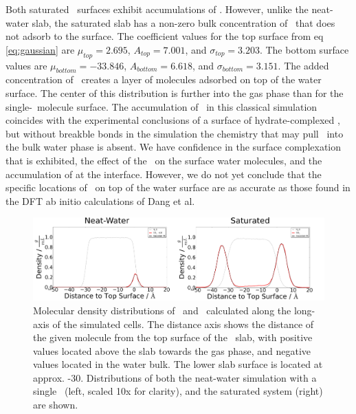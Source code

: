 Both saturated \suldiox~surfaces exhibit accumulations of \suldiox. However, unlike the neat-water slab, the saturated slab has a non-zero bulk concentration of \suldiox~that does not adsorb to the surface. The coefficient values for the top surface from eq \ref{eq:gaussian} are $\mu_{top}=2.695$, $A_{top}=7.001$, and $\sigma_{top}=3.203$. The bottom surface values are $\mu_{bottom}=-33.846$, $A_{bottom}=6.618$, and $\sigma_{bottom}=3.151$\angs. The added concentration of \suldiox~creates a layer of molecules adsorbed on top of the water surface. The center of this distribution is further into the gas phase than for the single-\suldiox~molecule surface. The accumulation of \suldiox~in this classical simulation coincides with the experimental conclusions of a surface of hydrate-complexed \suldiox, but without breakble bonds in the simulation the chemistry that may pull \suldiox~into the bulk water phase is absent. We have confidence in the surface complexation that is exhibited, the effect of the \suldiox~on the surface water molecules, and the accumulation of \suldiox at the interface. However, we do not yet conclude that the specific locations of \suldiox~on top of the water surface are as accurate as those found in the DFT ab initio calculations of Dang et al.\cite{Baer2010}

\begin{figure}[h!]
	\begin{center}
		\includegraphics[scale=1.0]{images/density/density.png}
		\caption{Molecular density distributions of \wat~and \suldiox~calculated along the long-axis of the simulated cells. The distance axis shows the distance of the given molecule from the top surface of the \wat~slab, with positive values located above the slab towards the gas phase, and negative values located in the water bulk. The lower slab surface is located at approx. -30\angs. Distributions of both the neat-water simulation with a single \suldiox~(left, scaled 10x for clarity), and the saturated system (right) are shown.}
		\label{fig:density}
	\end{center}
\end{figure}

